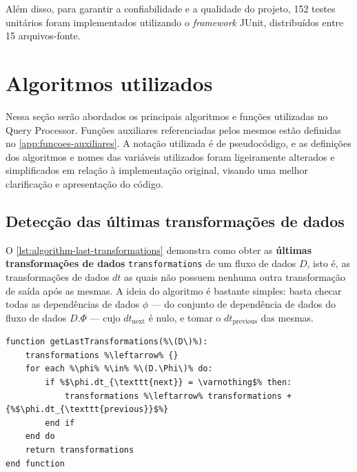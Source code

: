 Além disso, para garantir a confiabilidade e a qualidade do projeto, 152 testes unitários foram implementados utilizando o \textit{framework} JUnit, distribuídos entre 15 arquivos-fonte.

\section{Algoritmos utilizados}%
\label{sec:algoritmos-utilizados}

Nessa seção serão abordados os principais algoritmos e funções utilizadas no Query Processor. Funções auxiliares referenciadas pelos mesmos estão definidas no \autoref{app:funcoes-auxiliares}. A notação utilizada é de pseudocódigo, e as definições dos algoritmos e nomes das variáveis utilizados foram ligeiramente alterados e simplificados em relação à implementação original, visando uma melhor clarificação e apresentação do código.


\subsection{Detecção das últimas transformações de dados}

O \autoref{lst:algorithm-last-transformations} demonstra como obter as \textbf{últimas transformações de dados} \texttt{transformations} de um fluxo de dados \( D \), isto é, as transformações de dados \(dt\) as quais não possuem nenhuma outra transformação de saída após as mesmas. A ideia do algoritmo é bastante simples: basta checar todas as dependências de dados \( \phi \) --- do conjunto de dependência de dados do fluxo de dados \( D.\Phi \) --- cujo \( dt_{\textrm{next}} \) é nulo, e tomar o \( dt_{\textrm{previous}} \) das mesmas.

\begin{minipage}[c]{0.95\textwidth}
\begin{lstlisting}[language=pseudocode,label={lst:algorithm-last-transformations},caption={[Detecção das últimas transformações de dados]Detecção das útimas transformações de dados em uma especificação de fluxo de dados.}]
function getLastTransformations(%\(D\)%):
    transformations %\leftarrow% {}
    for each %\phi% %\in% %\(D.\Phi\)% do:
        if %$\phi.dt_{\texttt{next}} = \varnothing$% then:
            transformations %\leftarrow% transformations + {%$\phi.dt_{\texttt{previous}}$%}
        end if
    end do
    return transformations
end function
\end{lstlisting}
\end{minipage}

